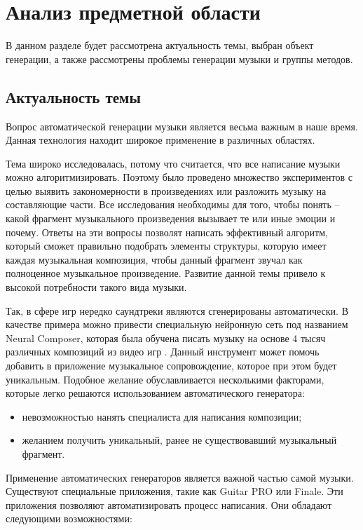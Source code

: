 \chapter{Анализ предметной области}

В данном разделе будет рассмотрена актуальность темы, выбран объект генерации, а также рассмотрены проблемы генерации музыки и группы методов.

\section{Актуальность темы}

Вопрос автоматической генерации музыки является весьма важным в наше время. Данная технология находит широкое применение в различных областях.

Тема широко исследовалась, потому что считается, что все написание музыки можно алгоритмизировать. Поэтому было проведено множество экспериментов \cite{music-mood} с целью выявить закономерности в произведениях или разложить музыку на составляющие части. Все исследования необходимы для того, чтобы понять -- какой фрагмент музыкального произведения вызывает те или иные эмоции и почему. Ответы на эти вопросы позволят написать эффективный алгоритм, который сможет правильно подобрать элементы структуры, которую имеет каждая музыкальная композиция, чтобы данный фрагмент звучал как полноценное музыкальное произведение. Развитие данной темы привело к высокой потребности такого вида музыки.

Так, в сфере игр нередко саундтреки являются сгенерированы автоматически. В качестве примера можно привести специальную нейронную сеть под названием Neural Composer, которая была обучена писать музыку на основе 4 тысяч различных композиций из видео игр \cite{neural-composer}. Данный инструмент может помочь добавить в приложение музыкальное сопровождение, которое при этом будет уникальным. Подобное желание обуславливается несколькими факторами, которые легко решаются использованием автоматического генератора:

\begin{itemize}
    \item невозможностью нанять специалиста для написания композиции;
    \item желанием получить уникальный, ранее не существовавший музыкальный фрагмент.
\end{itemize}

Применение автоматических генераторов является важной частью самой музыки. Существуют специальные приложения, такие как Guitar PRO или Finale. Эти приложения позволяют автоматизировать процесс написания. Они обладают следующими возможностями:

